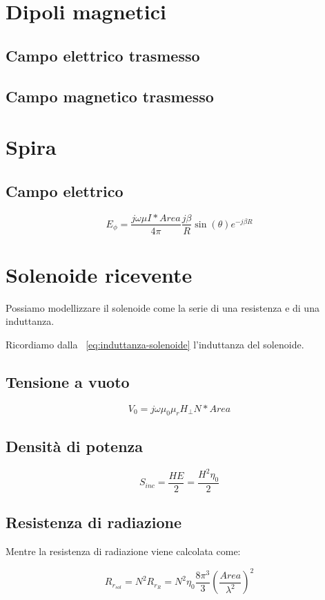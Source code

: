 \documentclass[10pt,a4paper]{report}
\begin{document}
			

		\section{Dipoli magnetici}
			
			\subsection{Campo elettrico trasmesso}

			\subsection{Campo magnetico trasmesso}

		\section{Spira}

			\subsection{Campo elettrico}

				\begin{equation}
				E_\phi=\frac{j\omega\mu I*Area}{4\pi}\frac{j\beta}{R}\sin(\theta)e^{-j\beta R}
				\end{equation}

		\section{Solenoide ricevente}
			
			Possiamo modellizzare il solenoide come la serie di una resistenza e di una induttanza.

			Ricordiamo dalla ~\ref{eq:induttanza-solenoide} l'induttanza del solenoide.

		 	\subsection{Tensione a vuoto}

				 \[
				 V_0=j\omega\mu_0\mu_rH_{\perp}N*Area
				 \]

			\subsection{Densità di potenza}

			 	\[
			 	S_{inc}=\frac{HE}{2}=\frac{H^2\eta_0}{2}
			 	\]

			\subsection{Resistenza di radiazione}
				 Mentre la resistenza di radiazione viene calcolata come:

				 \[
				 R_{r_{sol}}=N^2R_{r_{R}}=N^2\eta_0\frac{8\pi^3}{3}(\frac{Area}{\lambda^2})^2
				 \]
\end{document}
